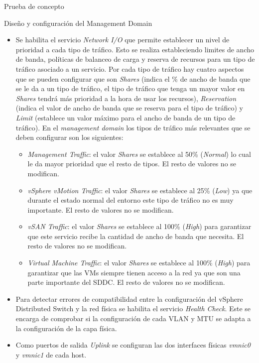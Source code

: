 \begin{section}{Prueba de concepto}
\begin{subsection}{Diseño y configuración del Management Domain}
\begin{itemize}
        \item Se habilita el servicio \textit{Network I/O} que permite establecer un nivel de prioridad a cada tipo de tráfico. Esto se realiza estableciendo limites de ancho de banda, políticas de balanceo de carga y reserva de recursos para un tipo de tráfico asociado a un servicio. Por cada tipo de tráfico hay cuatro aspectos que se pueden configurar que son \textit{Shares} (indica el \% de ancho de banda que se le da a un tipo de tráfico, el tipo de tráfico que tenga un mayor valor en \textit{Shares} tendrá más prioridad a la hora de usar los recursos), \textit{Reservation} (indica el valor de ancho de banda que se reserva para el tipo de tráfico) y \textit{Limit} (establece un valor máximo para el ancho de banda de un tipo de tráfico). En el \textit{management domain} los tipos de tráfico más relevantes que se deben configurar son los siguientes:
        \begin{itemize}
          \item \textit{Management Traffic}: el valor \textit{Shares} se establece al 50\% (\textit{Normal}) lo cual le da mayor prioridad que el resto de tipos. El resto de valores no se modifican.
          \item \textit{vSphere vMotion Traffic}: el valor \textit{Shares} se establece al 25\% (\textit{Low}) ya que durante el estado normal del entorno este tipo de tráfico no es muy importante. El resto de valores no se modifican.
          \item \textit{vSAN Traffic}: el valor \textit{Shares} se establece al 100\% (\textit{High}) para garantizar que este servicio recibe la cantidad de ancho de banda que necesita. El resto de valores no se modifican.
          \item \textit{Virtual Machine Traffic}: el valor \textit{Shares} se establece al 100\% (\textit{High}) para garantizar que las VMs siempre tienen acceso a la red ya que son una parte importante del SDDC. El resto de valores no se modifican.
        \end{itemize}
        
        \item Para detectar errores de compatibilidad entre la configuración del vSphere Distributed Switch y la red física se habilita el servicio \textit{Health Check}. Este se encarga de comprobar si la configuración de cada VLAN y MTU se adapta a la configuración de la capa física.
        
        \item Como puertos de salida \textit{Uplink} se configuran las dos interfaces físicas \textit{vmnic0} y \textit{vmnic1} de cada host.
        

\end{itemize}
\end{subsection}
\end{section}
